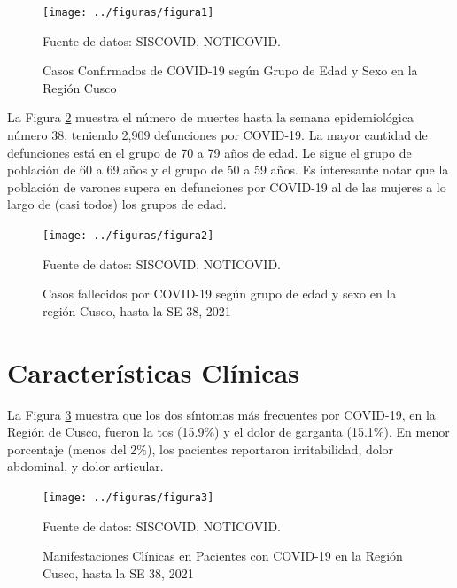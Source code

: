 \documentclass[12pt,a4paper,openany]{book}
\begin{document}
	\begin{figure}[h]
		\caption{Casos Confirmados de COVID-19 según Grupo de Edad y Sexo en la Región Cusco}\label{fig:casos_edad_sexo}
		\begin{center}
			\texttt{[image: ../figuras/figura1]}
		\end{center}
		{\footnotesize {Fuente de datos: SISCOVID, NOTICOVID.}}
	\end{figure}
	La Figura  \ref{fig:fallecidos_edad_sexo}  muestra el número de muertes hasta la semana epidemiológica número 38, teniendo 2,909 defunciones por COVID-19. La mayor cantidad de defunciones está en el grupo de 70 a 79 años de edad. Le sigue el grupo de población de 60 a 69 años y el grupo de 50 a 59 años. Es interesante notar que la población de varones supera en defunciones por COVID-19 al de las mujeres a lo largo de (casi todos) los grupos de edad.
	\begin{figure}[h]
		\caption{Casos fallecidos por COVID-19 según grupo de edad y sexo en la región Cusco, hasta la SE 38, 2021}\label{fig:fallecidos_edad_sexo}
		\begin{center}
			\texttt{[image: ../figuras/figura2]}
		\end{center}
		{\footnotesize {Fuente de datos: SISCOVID, NOTICOVID.}}
	\end{figure}
	
	\chapter*{Características Clínicas}
	
	\noindent La Figura \ref{fig:manifestaciones_clinicas}  muestra que los dos síntomas más frecuentes por COVID-19, en la Región de Cusco, fueron la tos (15.9$ \% $) y el dolor de garganta (15.1$ \% $). En menor porcentaje (menos del 2$ \% $), los pacientes reportaron irritabilidad, dolor abdominal, y dolor articular. 

	\begin{figure}[h]
		\caption{Manifestaciones Clínicas en Pacientes con COVID-19 en la Región Cusco, hasta la SE 38, 2021 }\label{fig:manifestaciones_clinicas}
		\begin{center}
			\texttt{[image: ../figuras/figura3]}
		\end{center}
		{\footnotesize {Fuente de datos: SISCOVID, NOTICOVID.}}
	\end{figure}
\end{document}
